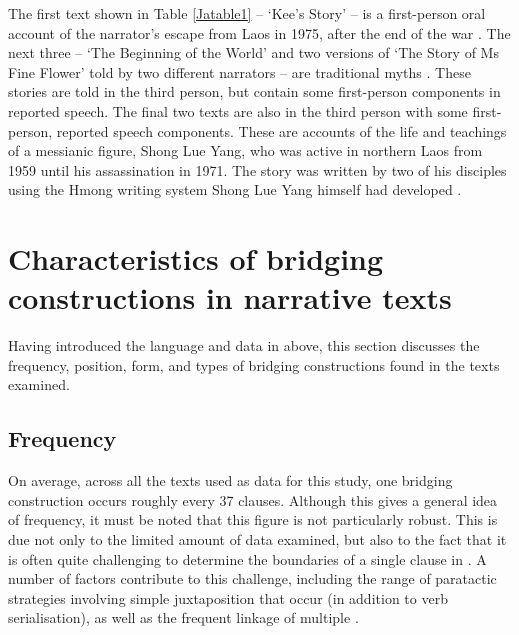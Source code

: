 \documentclass[output=paper]{LSP/langsci}
\begin{document}
The first text shown in Table \ref{Jatable1} -- `Kee’s Story' -- is a first-person oral account of the narrator’s escape from Laos in 1975, after the end of the war \citep[][225--235]{fuller85}. The next three -- `The Beginning of the World' and two versions of `The Story of Ms Fine Flower' told by two different narrators -- are traditional  myths \citep[][3--13, 120--140, 161--168]{johnson92}. These stories are told in the third person, but contain some first-person components in reported speech. The final two texts are also in the third person with some first-person, reported speech components. These are accounts of the life and teachings of a messianic figure, Shong Lue Yang, who was active in northern Laos from 1959 until his assassination in 1971. The story was written by two of his disciples using the Hmong writing system Shong Lue Yang himself had developed \citep[][11--37]{vang90}.

%
\section{Characteristics of bridging constructions in narrative texts} 
\label{Jasec:Characteristics}

Having introduced the language and data in  above, this section discusses the frequency, position, form, and types of bridging constructions found in the texts examined.
%
\subsection{Frequency}
\label{JaFrequency}
On average, across all the texts used as data for this study, one bridging construction occurs roughly every 37 clauses. Although this gives a general idea of frequency, it must be noted that this figure is not particularly robust. This is due not only to the limited amount of data examined, but also to the fact that it is often quite challenging to determine the boundaries of a single clause in . A number of factors contribute to this challenge, including the range of paratactic strategies involving simple juxtaposition that occur (in addition to verb serialisation), as well as the frequent linkage of multiple  \citep[][183--186, 237--241]{jarkey15}.
\end{document}
